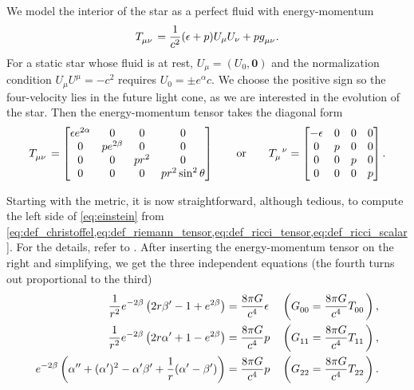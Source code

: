 We model the interior of the star as a perfect fluid with energy-momentum \cite[equation 1.114]{ref:carroll}
\begin{equation}
	T\indices{_\mu_\nu} = \frac{1}{c^2} (\epsilon+p) U_\mu U_\nu + p g\indices{_\mu_\nu}.
\end{equation}
For a static star whose fluid is at rest, $U_\mu = (U_0, \textbf{0})$ and the normalization condition $U_\mu U^\mu = -c^2$ requires $U_0 = \pm e^\alpha c$.
We choose the positive sign so the four-velocity lies in the future light cone, as we are interested in the evolution of the star.
Then the energy-momentum tensor takes the diagonal form
\begin{equation}
T\indices{_\mu_\nu} =
\begin{bmatrix}
	\epsilon e^{2\alpha} & 0            & 0     & 0                   \\
	0                    & p e^{2\beta} & 0     & 0                   \\
	0                    & 0            & p r^2 & 0                   \\
	0                    & 0            & 0     & p r^2 \sin^2 \theta \\
\end{bmatrix}
\qquad \text{or} \qquad
T\indices{_\mu^\nu} =
\begin{bmatrix}
	-\epsilon & 0 & 0 & 0 \\
	0         & p & 0 & 0 \\
	0         & 0 & p & 0 \\
	0         & 0 & 0 & p \\
\end{bmatrix}
.
\label{eq:einstein_to_tov:T}
\end{equation}

Starting with the metric, it is now straightforward, although tedious, to compute the left side of \cref{eq:einstein} from \cref{eq:def_christoffel,eq:def_riemann_tensor,eq:def_ricci_tensor,eq:def_ricci_scalar}.
For the details, refer to \cite[equation 5.11-5.15]{ref:carroll}.
After inserting the energy-momentum tensor on the right and simplifying, we get the three independent equations
(the fourth turns out proportional to the third)
\begin{subequations}
\begin{align}
	\frac{1}{r^2} e^{-2 \beta} \left( 2 r \beta' - 1 + e^{2 \beta} \right)                               &= \frac{8 \pi G}{c^4} \epsilon
	&& \left( G\indices{_0_0} = \frac{8 \pi G}{c^4} T\indices{_0_0} \right) , \label{eq:einstein_to_tov:tt} \\
	\frac{1}{r^2} e^{-2 \beta} \left( 2 r \alpha' + 1 - e^{2 \beta} \right)                              &= \frac{8 \pi G}{c^4} p
	&& \left( G\indices{_1_1} = \frac{8 \pi G}{c^4} T\indices{_1_1} \right) , \label{eq:einstein_to_tov:rr} \\
	e^{-2 \beta} \left( \alpha'' + (\alpha')^2 - \alpha' \beta' + \frac{1}{r} (\alpha' - \beta') \right) &= \frac{8 \pi G}{c^4} p
	&& \left( G\indices{_2_2} = \frac{8 \pi G}{c^4} T\indices{_2_2} \right) . \label{eq:einstein_to_tov:thetatheta}
\end{align}
\end{subequations}

